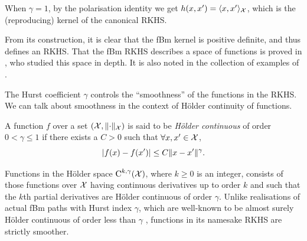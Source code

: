 \begin{remark}
  When $\gamma=1$, by the polarisation identity we get $h(x,x') = \langle x,x'\rangle_{\mathcal X}$, which is the (reproducing) kernel of the canonical RKHS.
\end{remark}

From its construction, it is clear that the fBm kernel is positive definite, and thus defines an RKHS.
That the fBm RKHS describes a space of functions is proved in \citet{cohen2002}, who studied this space in depth. 
It is also noted in the collection of examples of \citet[pp.71 \& 319]{berlinet2011reproducing}.

The Hurst coefficient $\gamma$ controls the ``smoothness'' of the functions in the RKHS. 
We can talk about smoothness in the context of Hölder continuity of functions.

\begin{definition}
  A function $f$ over a set $({\mathcal X}, \lVert\cdot\rVert_{\mathcal X})$ is said to be \emph{Hölder continuous} of order $0 <\gamma\leq 1$ if there exists a $C>0$ such that $\forall x,x'\in{\mathcal X}$,
  \[
    \vert f(x) - f(x') \vert \leq C \lVert x-x'\rVert^\gamma.
  \]
\end{definition}

Functions in the Hölder space $\text{C}^{k,\gamma}({\mathcal X})$, where $k\geq 0$ is an integer, consists of those functions over ${\mathcal X}$ having continuous derivatives up to order $k$ and such that the $k$th partial derivatives are Hölder continuous of order $\gamma$.
Unlike realisations of actual fBm paths with Hurst index $\gamma$, which are well-known to be almost surely Hölder continuous of order less than $\gamma$ \citep[Theorem 4.1.1]{embrechts2002selfsimilar}, functions in its namesake RKHS are strictly smoother.


